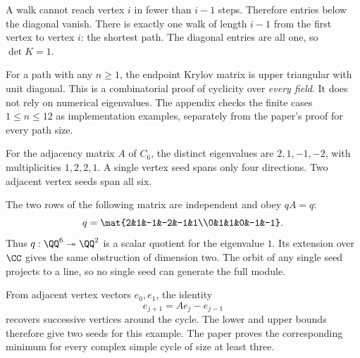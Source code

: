 A walk cannot reach vertex $i$ in fewer than $i-1$ steps. Therefore entries below the diagonal vanish. There is exactly one walk of length $i-1$ from the first vertex to vertex $i$: the shortest path. The diagonal entries are all one, so $\det K=1$.

For a path with any $n\ge1$, the endpoint Krylov matrix is upper triangular with unit diagonal. This is a combinatorial proof of cyclicity over \emph{every field}. It does not rely on numerical eigenvalues. The appendix checks the finite cases $1\le n\le12$ as implementation examples, separately from the paper's proof for every path size.


For the adjacency matrix $A$ of $C_6$, the distinct eigenvalues are $2,1,-1,-2$, with multiplicities $1,2,2,1$. A single vertex seed spans only four directions. Two adjacent vertex seeds span all six.


The two rows of the following matrix are independent and obey $qA=q$:
\[
q=\mat{2&1&-1&-2&-1&1\\0&1&1&0&-1&-1}.
\]
Thus $q:\QQ^6\twoheadrightarrow\QQ^2$ is a scalar quotient for the eigenvalue $1$. Its extension over $\CC$ gives the same obstruction of dimension two. The orbit of any single seed projects to a line, so no single seed can generate the full module.

From adjacent vertex vectors $e_0,e_1$, the identity
\[
e_{j+1}=Ae_j-e_{j-1}
\]
recovers successive vertices around the cycle. The lower and upper bounds therefore give two seeds for this example. The paper proves the corresponding minimum for every complex simple cycle of size at least three.


